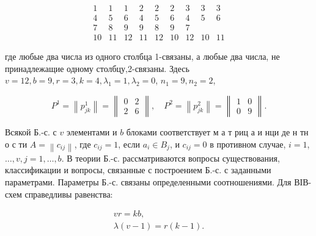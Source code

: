 \documentclass[10pt]{article}
\begin{document}
\[

\begin{array}{rrrrrrrrr}

1 & 1 & 1 & 2 & 2 & 2 & 3 & 3 & 3 \\

4 & 5 & 6 & 4 & 5 & 6 & 4 & 5 & 6 \\

7 & 8 & 9 & 9 & 8 & 9 & 7 \\

10 & 11 & 12 & 11 & 12 & 10 & 12 & 10 & 11

\end{array}

\]



где любые два числа из одного столбца 1-связаны, а любые два числа, не принадлежащие одному столбцу,2-связаны. Здесь $v=12, b=9, r=3, k=4, \lambda_{1}=1, \lambda_{2}=0$, $n_{1}=9, n_{2}=2$,



\[

P^{1}=\left\|p_{j k}^{1}\right\|=\left\|\begin{array}{cc}

0 & 2 \\

2 & 6

\end{array}\right\|, \quad P^{2}=\left\|p_{j k}^{2}\right\|=\left\|\begin{array}{cc}

1 & 0 \\

0 & 9

\end{array}\right\| .

\]



Всякой Б.-с. с $v$ элементами и $b$ блоками соответствует м а т риц а и нци де н тн о с ти $A=\left\|c_{i j}\right\|$, где $c_{i j}=1$, если $a_{i} \in B_{j}$, и $c_{i j}=0$ в противном случае, $i=1$, $\ldots, v, j=1, \ldots, b$. В теории Б.-с. рассматриваются вопросы существования, классификации и вопросы, связанные с построением Б.-с. с заданными параметрами. Параметры Б.-с. связаны определенными соотношениями. Для ВІВ-схем справедливы равенства:



\[

\begin{gathered}

v r=k b, \\

\lambda(v-1)=r(k-1) .

\end{gathered}

\]
\end{document}
